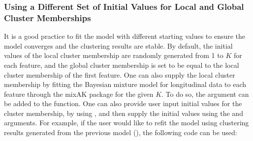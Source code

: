 \subsubsection{Using a Different Set of Initial Values for Local and Global Cluster Memberships}
It is a good practice to fit the model with different starting values to ensure the model converges and the clustering results are stable. By default, the initial values of the local cluster membership are randomly generated from 1 to $K$ for each feature, and the global cluster membership is set to be equal to the local cluster membership of the first feature. One can also supply the local cluster membership by fitting the Bayesian mixture model for longitudinal data to each feature through the mixAK package for the given $K$. To do so, the argument  can be added to the  function. One can also provide user input initial values for the cluster membership, by using , and then supply the initial values using the  and  arguments. For example, if the user would like to refit the model using clustering results generated from the previous model  (), the following code can be used:  
